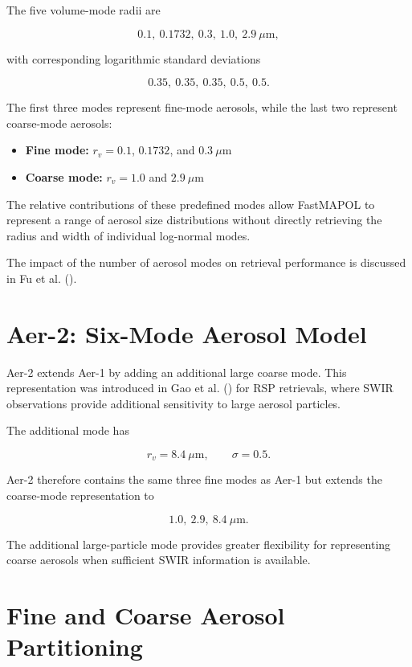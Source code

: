 \documentclass[
  11pt,
  letterpaper,
]{scrreprt}
\providecommand{\tightlist}{%
  \setlength{\itemsep}{0pt}\setlength{\parskip}{0pt}}
\begin{document}
The five volume-mode radii are

\[
0.1,\ 0.1732,\ 0.3,\ 1.0,\ 2.9\ \mu\mathrm{m},
\]

with corresponding logarithmic standard deviations

\[
0.35,\ 0.35,\ 0.35,\ 0.5,\ 0.5.
\]

The first three modes represent fine-mode aerosols, while the last two
represent coarse-mode aerosols:

\begin{itemize}
\tightlist
\item
  \textbf{Fine mode:} \(r_v=0.1\), \(0.1732\), and
  \(0.3\ \mu\mathrm{m}\)
\item
  \textbf{Coarse mode:} \(r_v=1.0\) and \(2.9\ \mu\mathrm{m}\)
\end{itemize}

The relative contributions of these predefined modes allow FastMAPOL to
represent a range of aerosol size distributions without directly
retrieving the radius and width of individual log-normal modes.

The impact of the number of aerosol modes on retrieval performance is
discussed in Fu et al. ().

\section{Aer-2: Six-Mode Aerosol
Model}\label{aer-2-six-mode-aerosol-model}

Aer-2 extends Aer-1 by adding an additional large coarse mode. This
representation was introduced in Gao et al.
() for RSP retrievals, where SWIR
observations provide additional sensitivity to large aerosol particles.

The additional mode has

\[
r_v=8.4\ \mu\mathrm{m},
\qquad
\sigma=0.5.
\]

Aer-2 therefore contains the same three fine modes as Aer-1 but extends
the coarse-mode representation to

\[
1.0,\ 2.9,\ 8.4\ \mu\mathrm{m}.
\]

The additional large-particle mode provides greater flexibility for
representing coarse aerosols when sufficient SWIR information is
available.

\section{Fine and Coarse Aerosol
Partitioning}\label{fine-and-coarse-aerosol-partitioning}
\end{document}
